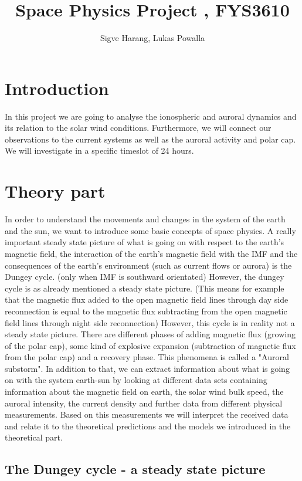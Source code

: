 \documentclass[10pt,a4paper]{article}
\author{Sigve Harang, Lukas Powalla}
\title{Space Physics Project , FYS3610}
\begin{document}
\maketitle
\newpage
\tableofcontents
\newpage
\section*{Introduction}
In this project we are going to analyse the ionospheric and auroral dynamics and its relation to the solar wind conditions. Furthermore, we will connect our observations to the current systems as well as the auroral activity and polar cap.  We will investigate in a specific timeslot of 24 hours.  
\section{Theory part}
In order to understand the movements and changes in the system of the earth and the sun, we want to introduce some basic concepts of space physics. 
A really important steady state picture of what is going on with respect to the earth's magnetic field, the interaction of the earth's magnetic field with the IMF and the consequences of the earth's environment (such as current flows or aurora) is the Dungey cycle. (only when IMF is southward orientated)
However, the dungey cycle is as already mentioned a steady state picture. (This means for example that the magnetic flux added to the open magnetic field lines through day side reconnection is equal to the magnetic flux subtracting from the open magnetic field lines through night side reconnection)
However, this cycle is in reality not a steady state picture. There are different phases of adding magnetic flux (growing of the polar cap), some kind of explosive expansion (subtraction of magnetic flux from the polar cap) and a recovery phase. This phenomena is called a "Auroral substorm". In addition to that, we can extract information about what is going on with the system earth-sun by looking at different data sets containing information about the magnetic field on earth, the solar wind bulk speed, the auroral intensity, the current density and further data from different physical measurements. 
Based on this measurements we will interpret the received data and relate it to the theoretical predictions and the models we introduced in the theoretical part.

\subsection{The Dungey cycle - a steady state picture}
\end{document}
